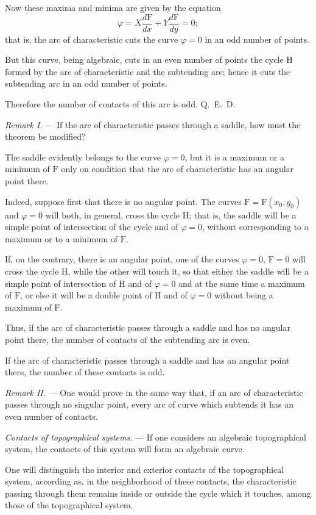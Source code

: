 \documentclass[11pt]{article}
\begin{document}
Now these maxima and minima are given by the equation
\[
\varphi=X\frac{d\mathrm F}{dx}+Y\frac{d\mathrm F}{dy}=0;
\]
that is, the arc of characteristic cuts the curve $\varphi=0$ in an odd number of points.

But this curve, being algebraic, cuts in an even number of points the cycle H formed by the arc of characteristic and the subtending arc; hence it cuts the subtending arc in an odd number of points.

Therefore the number of contacts of this arc is odd. \hfill\mbox{Q. E. D.}

\emph{Remark I.} --- If the arc of characteristic passes through a saddle, how must the theorem be modified?

The saddle evidently belongs to the curve $\varphi=0$, but it is a maximum or a minimum of $\mathrm F$ only on condition that the arc of characteristic has an angular point there.

Indeed, suppose first that there is no angular point. The curves $\mathrm F=\mathrm F(x_0,y_0)$ and $\varphi=0$ will both, in general, cross the cycle H; that is, the saddle will be a simple point of intersection of the cycle and of $\varphi=0$, without corresponding to a maximum or to a minimum of $\mathrm F$.

If, on the contrary, there is an angular point, one of the curves $\varphi=0$, $\mathrm F=0$ will cross the cycle H, while the other will touch it, so that either the saddle will be a simple point of intersection of H and of $\varphi=0$ and at the same time a maximum of $\mathrm F$, or else it will be a double point of H and of $\varphi=0$ without being a maximum of $\mathrm F$.

Thus, if the arc of characteristic passes through a saddle and has no angular point there, the number of contacts of the subtending arc is even.

If the arc of characteristic passes through a saddle and has an angular point there, the number of these contacts is odd.

\emph{Remark II.} --- One would prove in the same way that, if an arc of characteristic passes through no singular point, every arc of curve which subtends it has an even number of contacts.

\emph{Contacts of topographical systems.} --- If one considers an algebraic topographical system, the contacts of this system will form an algebraic curve.

One will distinguish the interior and exterior contacts of the topographical system, according as, in the neighborhood of these contacts, the characteristic passing through them remains inside or outside the cycle which it touches, among those of the topographical system.
\end{document}
